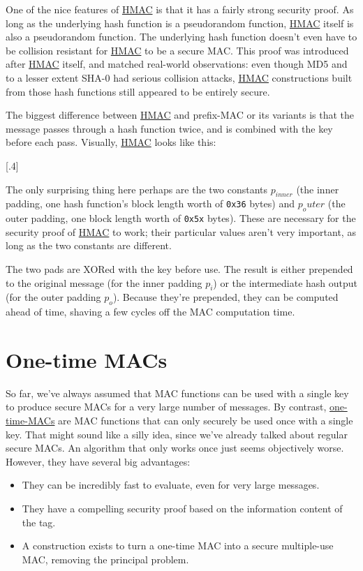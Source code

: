 \documentclass[11pt,ebook,table,dvipsnames]{memoir}
\begin{document}
One of the nice features of \hyperref[HMAC]{HMAC} is that it has a fairly strong
security proof. As long as the underlying hash function is a
pseudorandom function, \hyperref[HMAC]{HMAC} itself is also a pseudorandom function.
The underlying hash function doesn't even have to be collision
resistant for \hyperref[HMAC]{HMAC} to be a secure MAC. \cite{hmac:proof2} This proof
was introduced after \hyperref[HMAC]{HMAC} itself, and matched real-world observations:
even though MD5 and to a lesser extent SHA-0 had serious collision
attacks, \hyperref[HMAC]{HMAC} constructions built from those hash functions still
appeared to be entirely secure.

The biggest difference between \hyperref[HMAC]{HMAC} and prefix-MAC or its variants is
that the message passes through a hash function twice, and is combined
with the key before each pass. Visually, \hyperref[HMAC]{HMAC} looks like this:

[.4]

The only surprising thing here perhaps are the two constants
$p_{inner}$ (the inner padding, one hash function's block length worth
of \verb~0x36~ bytes) and $p_outer$ (the outer padding, one block length
worth of \verb~0x5x~ bytes). These are necessary for the security proof of
\hyperref[HMAC]{HMAC} to work; their particular values aren't very important, as long
as the two constants are different.

The two pads are XORed with the key before use. The result is either
prepended to the original message (for the inner padding $p_i$) or the
intermediate hash output (for the outer padding $p_o$). Because
they're prepended, they can be computed ahead of time, shaving a few
cycles off the MAC computation time.
\section{\label{One-time-MACs}One-time MACs}
\label{sec-2-7-5}

So far, we've always assumed that MAC functions can be used with a
single key to produce secure MACs for a very large number of messages.
By contrast, \hyperref[One-time MACs]{one-time-MACs} are MAC functions that can only securely be
used once with a single key. That might sound like a silly idea, since
we've already talked about regular secure MACs. An algorithm that only
works once just seems objectively worse. However, they have several big
advantages:

\begin{itemize}
\item They can be incredibly fast to evaluate, even for very large
messages.
\item They have a compelling security proof based on the information
content of the tag.
\item A construction exists to turn a one-time MAC into a secure
multiple-use MAC, removing the principal problem.
\end{itemize}
\end{document}
